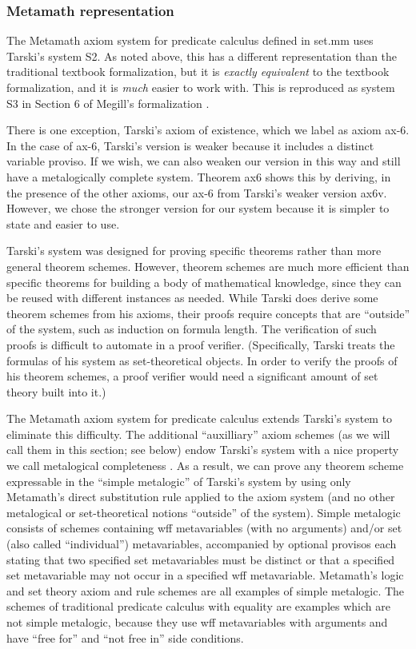 \subsubsection{Metamath representation}

The Metamath axiom system for predicate calculus
defined in set.mm uses Tarski's system S2.
As noted above, this has a different representation
than the traditional textbook formalization,
but it is \textit{exactly equivalent} to the textbook formalization,
and it is \textit{much} easier to work with.
This is reproduced as system S3 in Section 6 of
Megill's formalization \cite{Megill}.

There is one exception, Tarski's axiom of existence,
which we label as axiom ax-6.
In the case of ax-6, Tarski's version is weaker because it includes a
distinct variable proviso. If we wish, we can also weaken our version
in this way and still have a metalogically complete system. Theorem
ax6 shows this by deriving, in the presence of the other axioms, our
ax-6 from Tarski's weaker version ax6v. However, we chose the stronger
version for our system because it is simpler to state and easier to use.

Tarski's system was designed for proving specific theorems rather than
more general theorem schemes. However, theorem schemes are much more
efficient than specific theorems for building a body of mathematical
knowledge, since they can be reused with different instances as
needed. While Tarski does derive some theorem schemes from his axioms,
their proofs require concepts that are ``outside'' of the system, such as
induction on formula length. The verification of such proofs is difficult
to automate in a proof verifier. (Specifically, Tarski treats the formulas
of his system as set-theoretical objects. In order to verify the proofs
of his theorem schemes, a proof verifier would need a significant amount
of set theory built into it.)

The Metamath axiom system for predicate calculus extends
Tarski's system to eliminate this difficulty. The additional
``auxilliary'' axiom
schemes (as we will call them in this section; see below) endow Tarski's
system with a nice property we call
metalogical completeness \cite[Remark 9.6]{Megill}.
As a result, we can prove any theorem scheme
expressable in the ``simple metalogic'' of Tarski's system by using
only Metamath's direct substitution rule applied to the axiom system
(and no other metalogical or set-theoretical notions ``outside'' of the
system). Simple metalogic consists of schemes containing wff metavariables
(with no arguments) and/or set (also called ``individual'') metavariables,
accompanied by optional provisos each stating that two specified set
metavariables must be distinct or that a specified set metavariable may
not occur in a specified wff metavariable. Metamath's logic and set theory
axiom and rule schemes are all examples of simple metalogic. The schemes
of traditional predicate calculus with equality are examples which are
not simple metalogic, because they use wff metavariables with arguments
and have ``free for'' and ``not free in'' side conditions.


